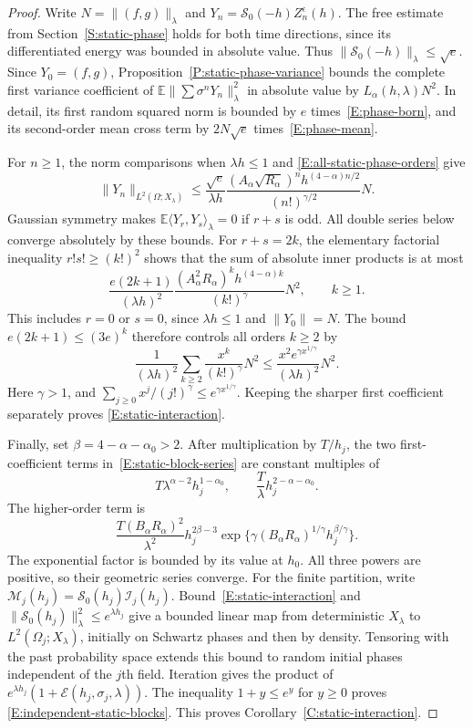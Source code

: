 \documentclass[12pt]{article}
\numberwithin{equation}{section}
\theoremstyle{definition}
\newcommand{\E}{\mathbb{E}}
\begin{document}
\begin{proof}
  Write $N=\|(f,g)\|_\lambda$ and
  $Y_n=\mathcal S_0(-h)Z_n^\epsilon(h)$.
  The free estimate from Section~\ref{S:static-phase} holds for both
  time directions, since its differentiated energy was bounded in
  absolute value. Thus $\|\mathcal S_0(-h)\|_\lambda\le\sqrt e$.
  Since $Y_0=(f,g)$, Proposition~\ref{P:static-phase-variance}
  bounds the complete first variance coefficient of
  $\E\|\sum\sigma^nY_n\|_\lambda^2$ in absolute value by
  $L_\alpha(h,\lambda)N^2$.
  In detail, its first random squared norm is bounded by
  $e$ times~\eqref{E:phase-born}, and its second-order mean
  cross term by $2N\sqrt e$ times~\eqref{E:phase-mean}.

  For $n\ge1$, the norm comparisons when $\lambda h\le1$ and
  \eqref{E:all-static-phase-orders} give
  \[
    \|Y_n\|_{L^2(\Omega;X_\lambda)}
    \le\frac{\sqrt e}{\lambda h}
    \frac{(A_\alpha\sqrt{R_\alpha})^n h^{(4-\alpha)n/2}}
    {(n!)^{\gamma/2}}N.
  \]
  Gaussian symmetry makes
  $\E\langle Y_r,Y_s\rangle_\lambda=0$ if $r+s$ is odd.
  All double series below converge absolutely by these bounds.
  For $r+s=2k$, the elementary factorial inequality
  $r!s!\ge(k!)^2$ shows that the sum of absolute inner products
  is at most
  \[
    \frac{e(2k+1)}{(\lambda h)^2}
    \frac{(A_\alpha^2R_\alpha)^k h^{(4-\alpha)k}}
    {(k!)^\gamma}N^2,\qquad k\ge1.
  \]
  This includes $r=0$ or $s=0$, since $\lambda h\le1$ and
  $\|Y_0\|=N$. The bound $e(2k+1)\le(3e)^k$ therefore controls
  all orders $k\ge2$ by
  \[
    \frac1{(\lambda h)^2}
    \sum_{k\ge2}\frac{x^k}{(k!)^\gamma}N^2
    \le\frac{x^2e^{\gamma x^{1/\gamma}}}{(\lambda h)^2}N^2.
  \]
  Here $\gamma>1$, and
  $\sum_{j\ge0}x^j/(j!)^\gamma\le e^{\gamma x^{1/\gamma}}$.
  Keeping the sharper first coefficient separately proves
  \eqref{E:static-interaction}.

  Finally, set $\beta=4-\alpha-\alpha_0>2$.
  After multiplication by $T/h_j$, the two first-coefficient
  terms in~\eqref{E:static-block-series} are constant multiples of
  \[
    T\lambda^{\alpha-2}h_j^{1-\alpha_0},\qquad
    \frac T\lambda h_j^{2-\alpha-\alpha_0}.
  \]
  The higher-order term is
  \[
    \frac{T(B_\alpha R_\alpha)^2}{\lambda^2}
    h_j^{2\beta-3}
    \exp\{\gamma(B_\alpha R_\alpha)^{1/\gamma}h_j^{\beta/\gamma}\}.
  \]
  The exponential factor is bounded by its value at $h_0$.
  All three powers are positive, so their geometric series converge.
  For the finite partition, write
  $\mathcal M_j(h_j)=\mathcal S_0(h_j)\mathcal I_j(h_j)$.
  Bound~\eqref{E:static-interaction} and
  $\|\mathcal S_0(h_j)\|_\lambda^2\le e^{\lambda h_j}$
  give a bounded linear map from deterministic $X_\lambda$ to
  $L^2(\Omega_j;X_\lambda)$, initially on Schwartz phases and then
  by density. Tensoring with the past probability space extends this
  bound to random initial phases independent of the $j$th field.
  Iteration gives the product of
  $e^{\lambda h_j}(1+\mathcal E(h_j,\sigma_j,\lambda))$.
  The inequality $1+y\le e^y$ for $y\ge0$ proves
  \eqref{E:independent-static-blocks}.
  This proves Corollary~\ref{C:static-interaction}.
\end{proof}
\end{document}
